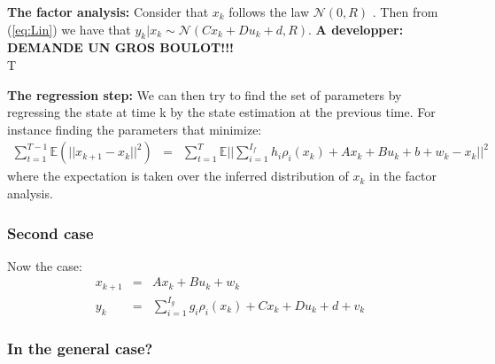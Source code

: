 \textbf{The factor analysis:} Consider that $x_k$ follows the law $\mathcal{N}(0,R)$ . Then from (\ref{eq:Lin}) we have that $y_k|x_k\sim\mathcal{N}(Cx_k+Du_k+d,R)$.  \textbf{A developper: DEMANDE UN GROS BOULOT!!!}\\
T

\textbf{The regression step:} We can then try to find the set of parameters by regressing the state at time k by the state estimation at the previous time. For instance finding the parameters that minimize:
\begin{eqnarray}
\sum_{t=1}^{T-1}{\mathbb{E}(||x_{k+1}-x_k||^2)}&=&\sum_{t=1}^T{\mathbb{E}||\sum_{i=1}^{I_f}{h_i\rho_i(x_k)}+Ax_k+Bu_k+b+w_k-x_k||^2}
\end{eqnarray}
where the expectation is taken over the inferred distribution of $x_k$ in the factor analysis.

\subsubsection{Second case}
Now the case:
\begin{eqnarray}
x_{k+1} &=& Ax_k+Bu_k+w_k\\
y_{k} &=& \sum_{i=1}^{I_g}{g_i\rho_i(x_k)}+Cx_k+Du_k+d+v_k
\end{eqnarray}

\subsubsection{In the general case?}
